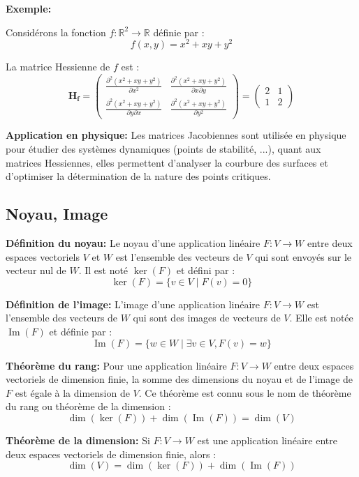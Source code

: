 \textbf{Exemple:}

Considérons la fonction $f : \mathbb{R}^2 \to \mathbb{R}$ définie par :
\[
f(x, y) = x^2 + xy + y^2
\]

La matrice Hessienne de $f$ est :
\[
\mathbf{H_f} = \begin{pmatrix}
\frac{\partial^2 (x^2 + xy + y^2)}{\partial x^2} & \frac{\partial^2 (x^2 + xy + y^2)}{\partial x \partial y} \\
\frac{\partial^2 (x^2 + xy + y^2)}{\partial y \partial x} & \frac{\partial^2 (x^2 + xy + y^2)}{\partial y^2}
\end{pmatrix}
= \begin{pmatrix}
2 & 1 \\
1 & 2
\end{pmatrix}
\]

\textbf{Application en physique:}
Les matrices Jacobiennes sont utilisée en physique pour étudier des systèmes dynamiques (points de stabilité, ...), quant aux matrices Hessiennes, elles permettent d'analyser la courbure des surfaces et d'optimiser la détermination de la nature des points critiques. 


\subsection{Noyau, Image}

\textbf{Définition du noyau:}
Le noyau d'une application linéaire $F : V \to W$ entre deux espaces vectoriels $V$ et $W$ est l'ensemble des vecteurs de $V$ qui sont envoyés sur le vecteur nul de $W$. Il est noté $\ker(F)$ et défini par :
\[
\ker(F) = \{ v \in V \mid F(v) = 0 \}
\]

\textbf{Définition de l'image:}
L'image d'une application linéaire $F : V \to W$ est l'ensemble des vecteurs de $W$ qui sont des images de vecteurs de $V$. Elle est notée $\operatorname{Im}(F)$ et définie par :
\[
\operatorname{Im}(F) = \{ w \in W \mid \exists v \in V, F(v) = w \}
\]

\textbf{Théorème du rang:}
Pour une application linéaire $F : V \to W$ entre deux espaces vectoriels de dimension finie, la somme des dimensions du noyau et de l'image de $F$ est égale à la dimension de $V$. Ce théorème est connu sous le nom de théorème du rang ou théorème de la dimension :
\[
\dim(\ker(F)) + \dim(\operatorname{Im}(F)) = \dim(V)
\]

\textbf{Théorème de la dimension:}
Si $F : V \to W$ est une application linéaire entre deux espaces vectoriels de dimension finie, alors :
\[
\dim(V) = \dim(\ker(F)) + \dim(\operatorname{Im}(F))
\]

